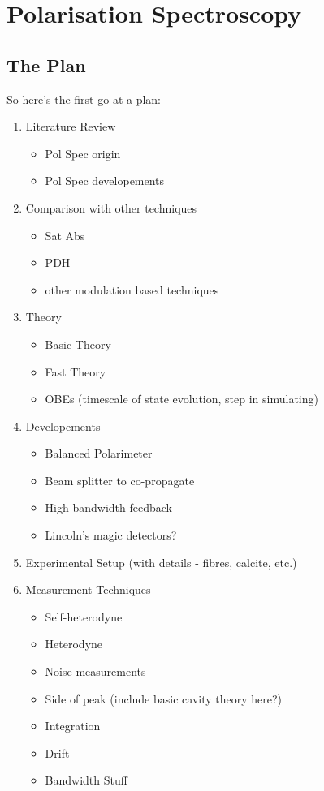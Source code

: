 \chapter{Polarisation Spectroscopy}

\section{The Plan}
So here's the first go at a plan:
\begin{enumerate}
    \item Literature Review
    \begin{itemize}
        \item Pol Spec origin
        \item Pol Spec developements
    \end{itemize}
    \item Comparison with other techniques
    \begin{itemize}
        \item Sat Abs
        \item PDH
        \item other modulation based techniques
    \end{itemize}
    \item Theory
    \begin{itemize}
        \item Basic Theory
        \item Fast Theory
        \item OBEs (timescale of state evolution, step in simulating)
    \end{itemize}
    \item Developements
    \begin{itemize}
        \item Balanced Polarimeter
        \item Beam splitter to co-propagate
        \item High bandwidth feedback
        \item Lincoln's magic detectors?
    \end{itemize}
    \item Experimental Setup (with details - fibres, calcite, etc.)
    \item Measurement Techniques
    \begin{itemize}
        \item Self-heterodyne
        \item Heterodyne
        \item Noise measurements
        \item Side of peak (include basic cavity theory here?)
        \item Integration
        \item Drift
        \item Bandwidth Stuff
    \end{itemize}
\end{enumerate}

